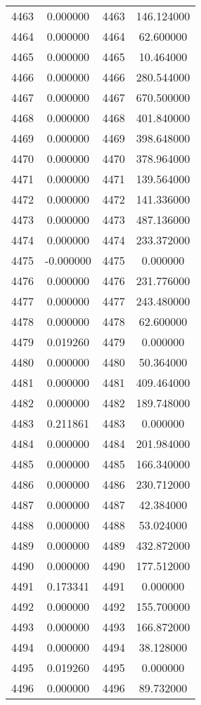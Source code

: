 \documentclass[12pt]{article}
\begin{document}
\begin{longtable}{@{}cccc@{}}
4463 & 0.000000 & 4463 & 146.124000 \\
4464 & 0.000000 & 4464 & 62.600000 \\
4465 & 0.000000 & 4465 & 10.464000 \\
4466 & 0.000000 & 4466 & 280.544000 \\
4467 & 0.000000 & 4467 & 670.500000 \\
4468 & 0.000000 & 4468 & 401.840000 \\
4469 & 0.000000 & 4469 & 398.648000 \\
4470 & 0.000000 & 4470 & 378.964000 \\
4471 & 0.000000 & 4471 & 139.564000 \\
4472 & 0.000000 & 4472 & 141.336000 \\
4473 & 0.000000 & 4473 & 487.136000 \\
4474 & 0.000000 & 4474 & 233.372000 \\
4475 & -0.000000 & 4475 & 0.000000 \\
4476 & 0.000000 & 4476 & 231.776000 \\
4477 & 0.000000 & 4477 & 243.480000 \\
4478 & 0.000000 & 4478 & 62.600000 \\
4479 & 0.019260 & 4479 & 0.000000 \\
4480 & 0.000000 & 4480 & 50.364000 \\
4481 & 0.000000 & 4481 & 409.464000 \\
4482 & 0.000000 & 4482 & 189.748000 \\
4483 & 0.211861 & 4483 & 0.000000 \\
4484 & 0.000000 & 4484 & 201.984000 \\
4485 & 0.000000 & 4485 & 166.340000 \\
4486 & 0.000000 & 4486 & 230.712000 \\
4487 & 0.000000 & 4487 & 42.384000 \\
4488 & 0.000000 & 4488 & 53.024000 \\
4489 & 0.000000 & 4489 & 432.872000 \\
4490 & 0.000000 & 4490 & 177.512000 \\
4491 & 0.173341 & 4491 & 0.000000 \\
4492 & 0.000000 & 4492 & 155.700000 \\
4493 & 0.000000 & 4493 & 166.872000 \\
4494 & 0.000000 & 4494 & 38.128000 \\
4495 & 0.019260 & 4495 & 0.000000 \\
4496 & 0.000000 & 4496 & 89.732000 \\

\end{longtable}
\end{document}
